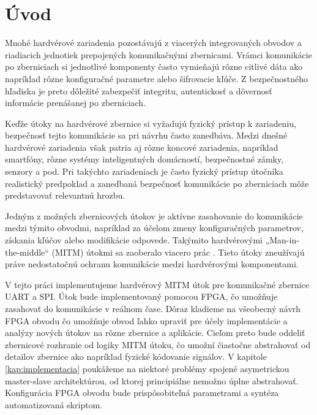 \chapter*{Úvod} %

Mnohé hardvérové zariadenia pozostávajú z viacerých integrovaných obvodov a riadiacich jednotiek prepojených komunikačnými zbernicami. Vrámci komunikácie po zberniciach si jednotlivé komponenty často vymieňajú rôzne citlivé dáta ako napríklad rôzne konfiguračné parametre alebo šifrovacie kľúče.  Z bezpečnostného hľadiska je preto dôležité zabezpečiť integritu, autentickosť a dôvernosť informácie prenášanej po zberniciach.

Keďže útoky na hardvérové zbernice si vyžadujú fyzický prístup k zariadeniu, bezpečnosť tejto komunikácie sa pri návrhu často zanedbáva. Medzi dnešné hardvérové zariadenia však patria aj rôzne koncové zariadenia, napríklad smartfóny, rôzne systémy inteligentných domácností, bezpečnostné zámky, senzory a pod. Pri takýchto zariadeniach je často fyzický prístup útočníka realistický predpoklad a zanedbaná bezpečnosť komunikácie po zberniciach môže predstavovať relevantnú hrozbu.

Jedným z možných zbernicových útokov je aktívne zasahovanie do komunikácie medzi týmito obvodmi, napríklad za účelom zmeny konfiguračných parametrov, získania kľúčov alebo modifikácie odpovede. Takýmito hardvérovými „Man-in-the-middle“ (MITM) útokmi sa zaoberalo viacero prác \cite{mitmCAN, mitmI2C, mitmSmartphone, mitmBitlocker, mitmTouch, mitmTPM}. Tieto útoky zneužívajú práve nedostatočnú ochranu komunikácie medzi hardvérovými komponentami.

V tejto práci implementujeme hardvérový MITM útok pre komunikačné zbernice UART a SPI. Útok bude implementovaný pomocou FPGA, čo umožňuje zasahovať do komunikácie v reálnom čase. Dôraz kladieme na všeobecný návrh FPGA obvodu čo umožňuje obvod ľahko upraviť pre účely implementácie a analýzy nových útokov na rôzne zbernice a aplikácie. Cieľom preto bude oddeliť zbernicové rozhranie od logiky MITM útoku, čo umožní čiastočne abstrahovať od detailov zbernice ako napríklad fyzické kódovanie signálov. V kapitole \ref{kap:implementacia} poukážeme na niektoré problémy spojené asymetrickou master-slave architektúrou, od ktorej principiálne nemožno úplne abstrahovať. Konfigurácia FPGA obvodu bude prispôsobiteľná parametrami a syntéza automatizovaná skriptom.

